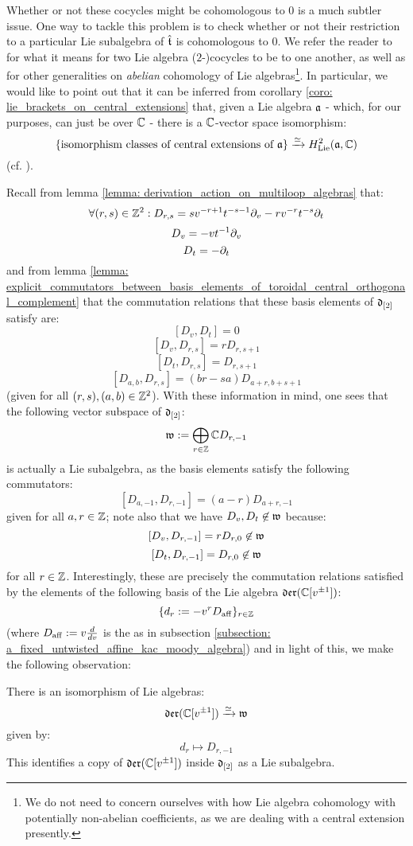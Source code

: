         Whether or not these cocycles might be cohomologous to $0$ is a much subtler issue. One way to tackle this problem is to check whether or not their restriction to a particular Lie subalgebra of $\hat{\mathfrak{t}}$ is cohomologous to $0$. We refer the reader to \cite[Chapter VII]{hilton_stammbach_homological_algebra} for what it means for two Lie algebra ($2$-)cocycles to be  to one another, as well as for other generalities on \textit{abelian} cohomology of Lie algebras\footnote{We do not need to concern ourselves with how Lie algebra cohomology with potentially non-abelian coefficients, as we are dealing with a central extension presently.}. In particular, we would like to point out that it can be inferred from corollary \ref{coro: lie_brackets_on_central_extensions} that, given a Lie algebra $\mathfrak{a}$ - which, for our purposes, can just be over $\mathbb{C}$ - there is a $\mathbb{C}$-vector space isomorphism:
            $$\{ \text{isomorphism classes of central extensions of $\mathfrak{a}$} \} \xrightarrow[]{\simeq} H^2_{\mathrm{Lie}}(\mathfrak{a}, \mathbb{C})$$
        (cf. \cite[Theorem VII.3.3]{hilton_stammbach_homological_algebra}). 

        Recall from lemma \ref{lemma: derivation_action_on_multiloop_algebras} that:
            $$\forall (r, s) \in \mathbb{Z}^2: D_{r, s} = s v^{-r + 1} t^{-s - 1} \partial_v - r v^{-r} t^{-s} \partial_t$$
            $$D_v = -v t^{-1} \partial_v$$
            $$D_t = -\partial_t$$
        and from lemma \ref{lemma: explicit_commutators_between_basis_elements_of_toroidal_central_orthogonal_complement} that the commutation relations that these basis elements of $\mathfrak{d}_{[2]}$ satisfy are:
            $$[D_v, D_t] = 0$$
            $$[D_v, D_{r, s}] = r D_{r, s + 1}$$
            $$[D_t, D_{r, s}] = D_{r, s + 1}$$
            $$[D_{a, b}, D_{r, s}] = (br - sa) D_{a + r, b + s + 1}$$
        (given for all $(r, s), (a, b) \in \mathbb{Z}^2$). With these information in mind, one sees that the following vector subspace of $\mathfrak{d}_{[2]}$:
            $$\mathfrak{w} := \bigoplus_{r \in \mathbb{Z}} \mathbb{C} D_{r, -1}$$
        is actually a Lie subalgebra, as the basis elements satisfy the following commutators:
            $$[D_{a, -1}, D_{r, -1}] = (a - r) D_{a + r, -1}$$
        given for all $a, r \in \mathbb{Z}$; note also that we have $D_v, D_t \not \in \mathfrak{w}$ because:
            $$[D_v, D_{r, -1}] = r D_{r, 0} \not \in \mathfrak{w}$$
            $$[D_t, D_{r, -1}] = D_{r, 0} \not \in \mathfrak{w}$$    
        for all $r \in \mathbb{Z}$. Interestingly, these are precisely the commutation relations satisfied by the elements of the following basis of the Lie algebra $\mathfrak{der}(\mathbb{C}[v^{\pm 1}])$:
            $$\{ d_r := -v^r D_{\mathrm{aff}} \}_{r \in \mathbb{Z}}$$
        (where $D_{\mathrm{aff}} := v \frac{d}{dv}$ is the  as in subsection \ref{subsection: a_fixed_untwisted_affine_kac_moody_algebra}) and in light of this, we make the following observation:
        \begin{lemma}
            There is an isomorphism of Lie algebras:
                $$\mathfrak{der}(\mathbb{C}[v^{\pm 1}]) \xrightarrow[]{\simeq} \mathfrak{w}$$
            given by:
                $$d_r \mapsto D_{r, -1}$$
            This identifies a copy of $\mathfrak{der}(\mathbb{C}[v^{\pm 1}])$ inside $\mathfrak{d}_{[2]}$ as a Lie subalgebra. 
        \end{lemma}

